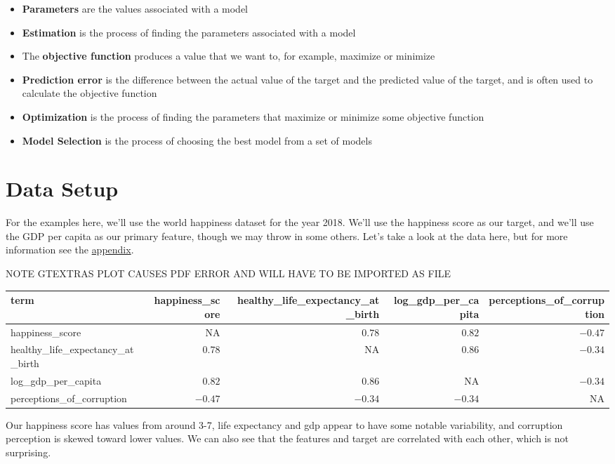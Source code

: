 \documentclass[
  letterpaper,
]{krantz}
\providecommand{\tightlist}{%
  \setlength{\itemsep}{0pt}\setlength{\parskip}{0pt}}\usepackage{longtable,booktabs,array}
\begin{document}
\begin{itemize}
\tightlist
\item
  \textbf{Parameters} are the values associated with a model
\item
  \textbf{Estimation} is the process of finding the parameters
  associated with a model
\item
  The \textbf{objective function} produces a value that we want to, for
  example, maximize or minimize
\item
  \textbf{Prediction error} is the difference between the actual value
  of the target and the predicted value of the target, and is often used
  to calculate the objective function
\item
  \textbf{Optimization} is the process of finding the parameters that
  maximize or minimize some objective function
\item
  \textbf{Model Selection} is the process of choosing the best model
  from a set of models
\end{itemize}

\section{Data Setup}\label{data-setup}

For the examples here, we'll use the world happiness dataset for the
year 2018. We'll use the happiness score as our target, and we'll use
the GDP per capita as our primary feature, though we may throw in some
others. Let's take a look at the data here, but for more information see
the \hyperref[appendix]{appendix}.

NOTE GTEXTRAS PLOT CAUSES PDF ERROR AND WILL HAVE TO BE IMPORTED AS FILE

\begin{longtable*}{lrrrr}
\toprule
term & happiness\_score & healthy\_life\_expectancy\_at\_birth & log\_gdp\_per\_capita & perceptions\_of\_corruption \\ 
\midrule
happiness\_score & NA & $0.78$ & $0.82$ & $-0.47$ \\ 
healthy\_life\_expectancy\_at\_birth & $0.78$ & NA & $0.86$ & $-0.34$ \\ 
log\_gdp\_per\_capita & $0.82$ & $0.86$ & NA & $-0.34$ \\ 
perceptions\_of\_corruption & $-0.47$ & $-0.34$ & $-0.34$ & NA \\ 
\bottomrule
\end{longtable*}

Our happiness score has values from around 3-7, life expectancy and gdp
appear to have some notable variability, and corruption perception is
skewed toward lower values. We can also see that the features and target
are correlated with each other, which is not surprising.
\end{document}
